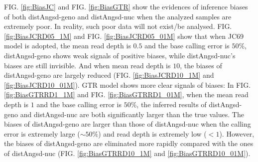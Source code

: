 \documentclass{article}
\begin{document}
FIG. \ref{fig:BiasJC} and FIG. \ref{fig:BiasGTR} show the evidences of inference biases of both distAngsd-geno and distAngsd-nuc when the analyzed samples are extremely poor. In reality, such poor data will not exist/be analysed. FIG. \ref{fig:BiasJCRD05_1M} and FIG. \ref{fig:BiasJCRD05_01M} show that when JC69 model is adopted, the mean read depth is $0.5$ and the base calling error is $50\%$, distAngsd-geno shows weak signals of positive biases, while distAngsd-nuc's biases are still invisible. And when mean read depth is $10$, the biases of distAngsd-geno are largely reduced (FIG. \ref{fig:BiasJCRD10_1M} and \ref{fig:BiasJCRD10_01M}). GTR model shows more clear signals of biases: In FIG. \ref{fig:BiasGTRRD1_1M} and FIG. \ref{fig:BiasGTRRD1_01M}, when the mean read depth is $1$ and the base calling error is $50\%$, the inferred results of distAngsd-geno and distAngsd-nuc are both significantly larger than the true values. The biases of distAngsd-geno are larger than those of distAngsd-nuc when the calling error is extremely large ($\sim 50\%$) and read depth is extremely low ($<1$). However, the biases of distAngsd-geno are eliminated more rapidly compared with the ones of distAngsd-nuc (FIG. \ref{fig:BiasGTRRD10_1M} and \ref{fig:BiasGTRRD10_01M}). 
\end{document}
